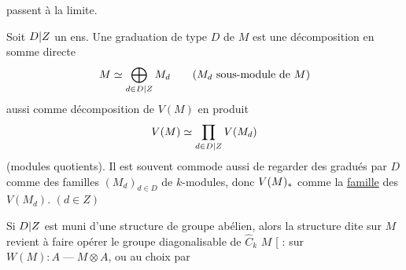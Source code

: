 passent à la limite.

Soit  ${D|Z}$ un ens. Une graduation de type $D$ de $M$ est une décomposition en somme directe
\[
M\simeq\bigoplus_{d\in{D|Z}}M_d\qquad(M_d\text{ sous-module de }M)
\]
 aussi comme décomposition de $V(M)$ en produit
\[
V(M)\simeq\prod_{d\in{D|Z}}V(M_d)
\]
(modules quotients). Il est souvent commode aussi de regarder  des  gradués par $D$ comme des familles $(M_d)_{d\in D}$ de $k$-modules, donc $V(M)_{{*}}$ comme la \uline{famille} des $V(M_d)$. $(d\in Z)$

Si ${D|Z}$ est muni d'une structure de groupe abélien, alors la structure dite sur $M$ revient à faire opérer le groupe diagonalisable de $\widehat C_k$
 $M$ [ : sur $W(M):A\mathbin{\text{---}}M\otimes A$, ou au choix par
